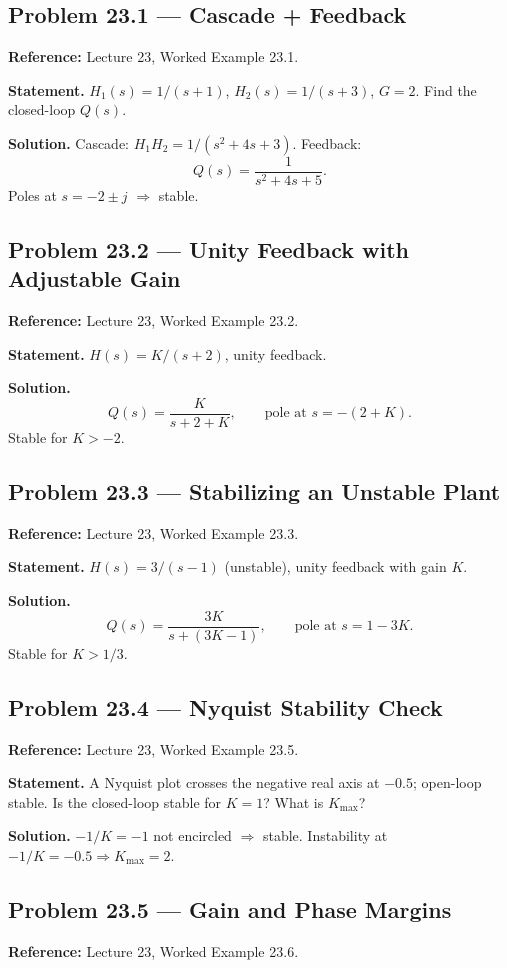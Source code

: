 \documentclass[11pt]{article}
\begin{document}
\subsection{Problem 23.1 --- Cascade + Feedback}
\textbf{Reference:} Lecture 23, Worked Example 23.1.

\textbf{Statement.} $H_1(s) = 1/(s+1)$, $H_2(s) = 1/(s+3)$, $G=2$. Find the closed-loop $Q(s)$.

\textbf{Solution.} Cascade: $H_1 H_2 = 1/(s^2+4s+3)$. Feedback:
\[
Q(s) = \frac{1}{s^2+4s+5}.
\]
Poles at $s=-2\pm j$ $\Rightarrow$ stable.

\subsection{Problem 23.2 --- Unity Feedback with Adjustable Gain}
\textbf{Reference:} Lecture 23, Worked Example 23.2.

\textbf{Statement.} $H(s) = K/(s+2)$, unity feedback.

\textbf{Solution.}
\[
Q(s) = \frac{K}{s+2+K},\qquad \text{pole at }s=-(2+K).
\]
Stable for $K>-2$.

\subsection{Problem 23.3 --- Stabilizing an Unstable Plant}
\textbf{Reference:} Lecture 23, Worked Example 23.3.

\textbf{Statement.} $H(s) = 3/(s-1)$ (unstable), unity feedback with gain $K$.

\textbf{Solution.}
\[
Q(s) = \frac{3K}{s+(3K-1)},\qquad \text{pole at }s=1-3K.
\]
Stable for $K>1/3$.

\subsection{Problem 23.4 --- Nyquist Stability Check}
\textbf{Reference:} Lecture 23, Worked Example 23.5.

\textbf{Statement.} A Nyquist plot crosses the negative real axis at $-0.5$; open-loop stable. Is the closed-loop stable for $K=1$? What is $K_\text{max}$?

\textbf{Solution.} $-1/K = -1$ not encircled $\Rightarrow$ stable. Instability at $-1/K=-0.5\Rightarrow K_\text{max}=2$.

\subsection{Problem 23.5 --- Gain and Phase Margins}
\textbf{Reference:} Lecture 23, Worked Example 23.6.
\end{document}
